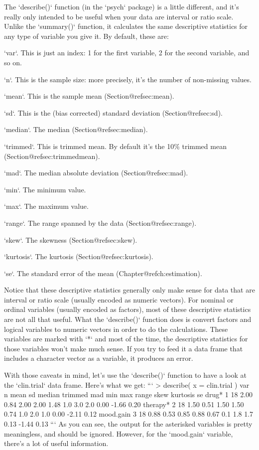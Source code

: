 The `describe()` function (in the `psych` package) is a little different, and it's really only intended to be useful when your data are interval or ratio scale. Unlike the `summary()` function, it calculates the same descriptive statistics for any type of variable you give it. By default, these are:
\itemsep -3pt
\item `var`. This is just an index: 1 for the first variable, 2 for the second variable, and so on.
\item `n`. This is the sample size: more precisely, it's the number of non-missing values.
\item `mean`. This is the sample mean (Section@refsec:mean).
\item `sd`. This is the (bias corrected) standard deviation (Section@refsec:sd).
\item `median`. The median (Section@refsec:median).
\item `trimmed`. This is trimmed mean. By default it's the 10\% trimmed mean (Section@refsec:trimmedmean).
\item `mad`. The median absolute deviation (Section@refsec:mad).
\item `min`. The minimum value.
\item `max`. The maximum value. 
\item `range`. The range spanned by the data (Section@refsec:range).
\item `skew`. The skewness (Section@refsec:skew).
\item `kurtosis`. The kurtosis (Section@refsec:kurtosis).
\item `se`. The standard error of the mean (Chapter@refch:estimation).

Notice that these descriptive statistics generally only make sense for data that are interval or ratio scale (usually encoded as numeric vectors). For nominal or ordinal variables (usually encoded as factors), most of these descriptive statistics are not all that useful. What the `describe()` function does is convert factors and logical variables to numeric vectors in order to do the calculations. These variables are marked with `*` and most of the time, the descriptive statistics for those variables won't make much sense. If you try to feed it a data frame that includes a character vector as a variable, it produces an error.

With those caveats in mind, let's use the `describe()` function to have a look at the `clin.trial` data frame. Here's what we get:
```
> describe( x = clin.trial )
          var  n mean   sd median trimmed  mad min max range skew kurtosis   se
drug*       1 18 2.00 0.84   2.00    2.00 1.48 1.0 3.0   2.0 0.00    -1.66 0.20
therapy*    2 18 1.50 0.51   1.50    1.50 0.74 1.0 2.0   1.0 0.00    -2.11 0.12
mood.gain   3 18 0.88 0.53   0.85    0.88 0.67 0.1 1.8   1.7 0.13    -1.44 0.13
```
As you can see, the output for the asterisked variables is pretty meaningless, and should be ignored. However, for the `mood.gain` variable, there's a lot of useful information. 


